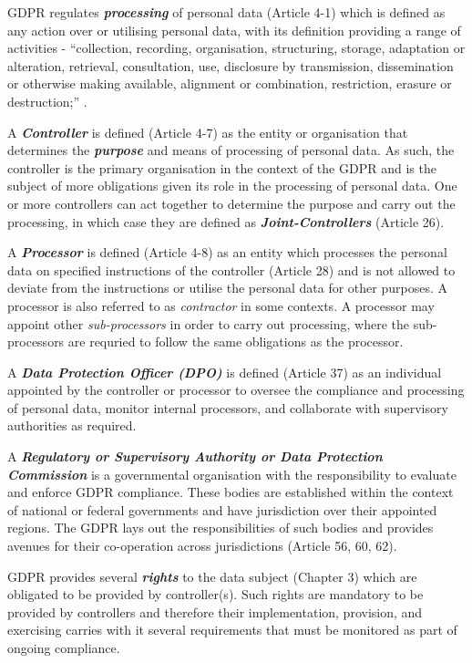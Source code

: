 GDPR regulates \textit{\textbf{processing}} of personal data (Article 4-1) which is defined as any action over or utilising personal data, with its definition providing a range of activities - ``collection, recording, organisation, structuring, storage, adaptation or alteration, retrieval, consultation, use, disclosure by transmission, dissemination or otherwise making available, alignment or combination, restriction, erasure or destruction;'' \cite{Regulation_GDPR}.

A \textit{\textbf{Controller}} is defined (Article 4-7) as the entity or organisation that determines the \textit{\textbf{purpose}} and means of processing of personal data. As such, the controller is the primary organisation in the context of the GDPR and is the subject of more obligations given its role in the processing of personal data. One or more controllers can act together to determine the purpose and carry out the processing, in which case they are defined as \textit{\textbf{Joint-Controllers}} (Article 26).

A \textit{\textbf{Processor}} is defined (Article 4-8) as an entity which processes the personal data on specified instructions of the controller (Article 28) and is not allowed to deviate from the instructions or utilise the personal data for other purposes. A processor is also referred to as \textit{contractor} in some contexts. A processor may appoint other \textit{sub-processors} in order to carry out processing, where the sub-processors are requried to follow the same obligations as the processor.

A \textit{\textbf{Data Protection Officer (DPO)}} is defined (Article 37) as an individual appointed by the controller or processor to oversee the compliance and processing of personal data, monitor internal processors, and collaborate with supervisory authorities as required.

A \textit{\textbf{Regulatory or Supervisory Authority or Data Protection Commission}} is a governmental organisation with the responsibility to evaluate and enforce GDPR compliance. These bodies are established within the context of national or federal governments and have jurisdiction over their appointed regions. The GDPR lays out the responsibilities of such bodies and provides avenues for their co-operation across jurisdictions (Article 56, 60, 62).

GDPR provides several \textbf{\textit{rights}} to the data subject (Chapter 3) which are obligated to be provided by controller(s). Such rights are mandatory to be provided by controllers and therefore their implementation, provision, and exercising carries with it several requirements that must be monitored as part of ongoing compliance.

